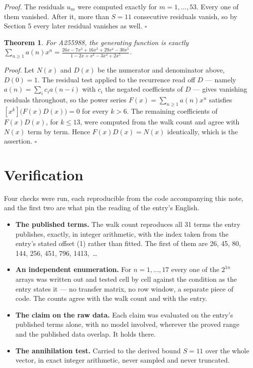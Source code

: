 \documentclass[11pt]{article}
\newtheorem{theorem}{Theorem}
\theoremstyle{definition}
\begin{document}
{\itshape Proof.} The residuals $u_m$ were computed exactly for $m = 1,\dots,53$. Every one of them vanished. After it, more than $S = 11$ consecutive residuals vanish, so by Section 5 every later residual vanishes as well. $\square$

\begin{theorem} For A255988, the generating function is exactly $\sum_{n\ge 1} a(n)x^n = \frac{26x - 7x^{2} + 16x^{3} + 29x^{4} - 30x^{5}}{1 - 2x + x^{2} - 3x^{4} + 2x^{5}}$.\end{theorem}

{\itshape Proof.} Let $N(x)$ and $D(x)$ be the numerator and denominator above, $D(0)=1$. The residual test applied to the recurrence read off $D$ --- namely $a(n) = \sum_i c_i a(n-i)$ with $c_i$ the negated coefficients of $D$ --- gives vanishing residuals throughout, so the power series $F(x)=\sum_{n\ge 1}a(n)x^n$ satisfies $[x^k]\bigl(F(x)D(x)\bigr) = 0$ for every $k > 6$. The remaining coefficients of $F(x)D(x)$, for $k \le 13$, were computed from the walk count and agree with $N(x)$ term by term. Hence $F(x)D(x) = N(x)$ identically, which is the assertion. $\square$

\section{Verification}

Four checks were run, each reproducible from the code accompanying this note, and the first two are what pin the reading of the entry's English.

\begin{itemize}

\item {\bfseries The published terms.} The walk count reproduces all 31 terms the entry publishes, exactly, in integer arithmetic, with the index taken from the entry's stated offset (1) rather than fitted. The first of them are 26, 45, 80, 144, 256, 451, 796, 1413,~\dots

\item {\bfseries An independent enumeration.} For $n = 1,\dots,17$ every one of the $2^{1n}$ arrays was written out and tested cell by cell against the condition as the entry states it --- no transfer matrix, no row window, a separate piece of code. The counts agree with the walk count and with the entry.

\item {\bfseries The claim on the raw data.} Each claim was evaluated on the entry's published terms alone, with no model involved, wherever the proved range and the published data overlap. It holds there.

\item {\bfseries The annihilation test.} Carried to the derived bound $S = 11$ over the whole vector, in exact integer arithmetic, never sampled and never truncated.

\end{itemize}
\end{document}
